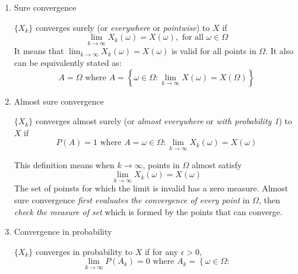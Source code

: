 \begin{enumerate}
\begin{enumerate}
		      \item
		            Sure convergence
		            \begin{definition}
			            $\{X_{k}\}$ converges surely (or \textit{everywhere} or \textit{pointwise}) to $X$ if
			            \begin{equation*}
				            \lim_{k \to \infty}X_{k}(\omega)=X(\omega), \text{ for all } \omega \in \Omega
			            \end{equation*}
			            It means that $\lim_{k \to \infty}X_{k}(\omega)=X(\omega)$ is valid for all points in $\Omega$. It also can be
			            equivalently stated as:
			            \begin{equation*}
				            A=\Omega \text{ where } A=\left\{\omega \in \Omega: \lim_{k \to \infty} X(\omega)=X(\Omega)\right\}
			            \end{equation*}
		            \end{definition}
		      \item
		            Almost sure convergence
		            \begin{definition}
			            $\{X_{k}\}$ converges almost surely (or \textit{almost everywhere} or \textit{with probability 1}) to $X$ if
			            \begin{equation*}
				            P(A)=1 \text{ where } A={\omega \in \Omega: \lim_{k \to \infty}X_{k}(\omega)=X(\omega)}
			            \end{equation*}
		            \end{definition}
		            This definition means when $k \to \infty$, points in $\Omega$ almost satisfy
		            \begin{equation*}
			            \lim_{k \to \infty}X_{k}(\omega)=X(\omega)
		            \end{equation*}
		            The set of poinsts for which the limit is invalid has a zero measure. Almost sure convergence \emph{first evaluates
			            the convergence of every point} in $\Omega$, then \emph{check the measure of set} which is formed by the points
		            that can converge.
		      \item
		            Convergence in probability
		            \begin{definition}
			            $\{X_{k}\}$ converges in probability to $X$ if for any $\epsilon > 0$,
			            \begin{equation*}
				            \lim_{k \to \infty}P(A_{k}) = 0 \text{ where } A_{k}=\left\{\omega \in \Omega:

\end{equation*}
\end{definition}
\end{enumerate}
\end{enumerate}
